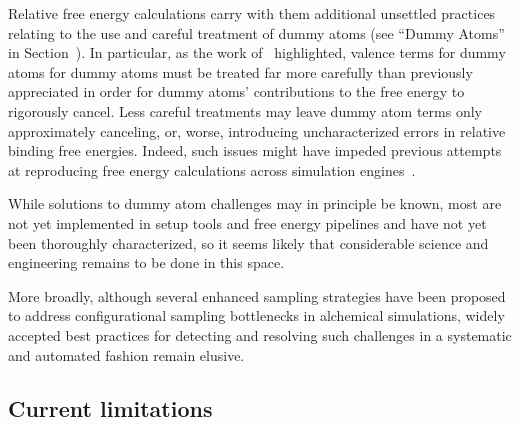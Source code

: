\documentclass[9pt,bestpractices]{livecoms}
\begin{document}
Relative free energy calculations carry with them additional unsettled practices relating to the use and careful treatment of dummy atoms (see ``Dummy Atoms'' in Section~\label{sec:relative-fe-protocol}). In particular, as the work of~\cite{Fleck_2021} highlighted, valence terms for dummy atoms for dummy atoms must be treated far more carefully than previously appreciated in order for dummy atoms' contributions to the free energy to rigorously cancel. Less careful treatments may leave dummy atom terms only approximately canceling, or, worse, introducing uncharacterized errors in relative binding free energies. Indeed, such issues might have impeded previous attempts at reproducing free energy calculations across simulation engines~\cite{loeffler2018reproducibility}. 

While solutions to dummy atom challenges may in principle be known, most are not yet implemented in setup tools and free energy pipelines and have not yet been thoroughly characterized, so it seems likely that considerable science and engineering remains to be done in this space. 

More broadly, although several enhanced sampling strategies have been proposed to address configurational sampling bottlenecks in alchemical simulations, widely accepted best practices for detecting and resolving such challenges in a systematic and automated fashion remain elusive. 

\subsection{Current limitations}


\end{document}
